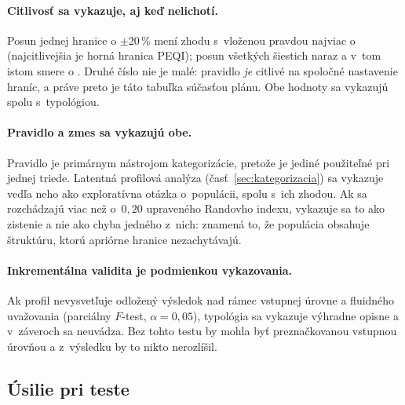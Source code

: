 \paragraph{Citlivosť sa vykazuje, aj keď nelichotí.} Posun jednej hranice o
$\pm$20\,\% mení zhodu s~vloženou pravdou najviac o~\asmCutSingle{} (najcitlivejšia
je horná hranica PEQI); posun všetkých šiestich naraz a v~tom istom smere o
\asmCutJoint{}. Druhé číslo nie je malé: pravidlo \emph{je} citlivé na spoločné
nastavenie hraníc, a práve preto je táto tabuľka súčasťou plánu. Obe hodnoty sa
vykazujú spolu s~typológiou.

\paragraph{Pravidlo a zmes sa vykazujú obe.} Pravidlo je primárnym nástrojom
kategorizácie, pretože je jediné použiteľné pri jednej triede. Latentná profilová
analýza (časť~\ref{sec:kategorizacia}) sa vykazuje vedľa neho ako exploratívna
otázka o~populácii, spolu s~ich zhodou. Ak sa rozchádzajú viac než o~$0{,}20$
upraveného Randovho indexu, vykazuje sa to ako zistenie a nie ako chyba jedného
z~nich: znamená to, že populácia obsahuje štruktúru, ktorú apriórne hranice
nezachytávajú.

\paragraph{Inkrementálna validita je podmienkou vykazovania.} Ak profil
nevysvetľuje odložený výsledok nad rámec vstupnej úrovne a fluidného uvažovania
(parciálny $F$-test, $\alpha = 0{,}05$), typológia sa vykazuje výhradne opisne a
v~záveroch sa neuvádza. Bez tohto testu by mohla byť preznačkovanou vstupnou
úrovňou a z~výsledku by to nikto nerozlíšil.

\subsection{Úsilie pri teste}

